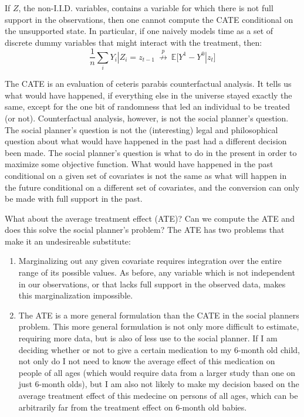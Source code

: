 \documentclass[a4paper,12pt]{article}
\begin{document}
If $Z$, the non-I.I.D. variables, contains a variable for which there is not full support in the observations, then one cannot compute the CATE conditional on the unsupported state. In particular, if one naively models time as a set of discrete dummy variables that might interact with the treatment, then: 
%
$$
\frac{1}{n} \sum_i Y_i | Z_{i}=z_{t-1} \ \overset{p}{\not\to} \ \mathbb{E}\big[ Y^1 - Y^0 | z_t \big]
$$

The CATE is an evaluation of ceteris parabis counterfactual analysis. It tells us what would have happened, if everything else in the universe stayed exactly the same, except for the one bit of randomness that led an individual to be treated (or not). Counterfactual analysis, however, is not the social planner's question. The social planner's question is not the (interesting) legal and philosophical question about what would have happened in the past had a different decision been made. The social planner's question is what to do in the present in order to maximize some objective function. What would have happened in the past conditional on a given set of covariates is not the same as what will happen in the future conditional on a different set of covariates, and the conversion can only be made with full support in the past. 

What about the average treatment effect (ATE)? Can we compute the ATE and does this solve the social planner's problem? The ATE has two problems that make it an undesireable substitute:

\begin{enumerate}

\item Marginalizing out any given covariate requires integration over the entire range of its possible values. As before, any variable which is not independent in our observations, or that lacks full support in the observed data, makes this marginalization impossible.

\item The ATE is a more general formulation than the CATE in the social planners problem. This more general formulation is not only more difficult to estimate, requiring more data, but is also of less use to the social planner. If I am deciding whether or not to give a certain medication to my 6-month old child, not only do I not need to know the average effect of this medication on people of all ages (which would require data from a larger study than one on just 6-month olds), but I am also not likely to make my decision based on the average treatment effect of this medecine on persons of all ages, which can be arbitrarily far from the treatment effect on 6-month old babies.

\end{enumerate}
\end{document}
